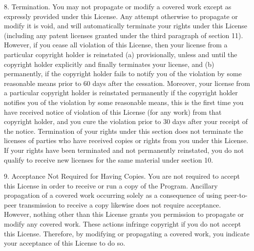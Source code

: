 \documentclass {book}
\begin{document}
\begin{tiny}
8. Termination. You may not propagate or modify a covered work except as expressly provided under this License. Any attempt otherwise to propagate or modify it is void, and will automatically terminate your rights under this License (including any patent licenses granted under the third paragraph of section 11). However, if you cease all violation of this License, then your license from a particular copyright holder is reinstated (a) provisionally, unless and until the copyright holder explicitly and finally terminates your license, and (b) permanently, if the copyright holder fails to notify you of the violation by some reasonable means prior to 60 days after the cessation. Moreover, your license from a particular copyright holder is reinstated permanently if the copyright holder notifies you of the violation by some reasonable means, this is the first time you have received notice of violation of this License (for any work) from that copyright holder, and you cure the violation prior to 30 days after your receipt of the notice. Termination of your rights under this section does not terminate the licenses of parties who have received copies or rights from you under this License. If your rights have been terminated and not permanently reinstated, you do not qualify to receive new licenses for the same material under section 10.

9. Acceptance Not Required for Having Copies. You are not required to accept this License in order to receive or run a copy of the Program. Ancillary propagation of a covered work occurring solely as a consequence of using peer-to-peer transmission to receive a copy likewise does not require acceptance. However, nothing other than this License grants you permission to propagate or modify any covered work. These actions infringe copyright if you do not accept this License. Therefore, by modifying or propagating a covered work, you indicate your acceptance of this License to do so.


\end{tiny}
\end{document}
